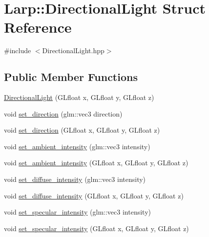 \hypertarget{structLarp_1_1DirectionalLight}{}\section{Larp\+:\+:Directional\+Light Struct Reference}
\label{structLarp_1_1DirectionalLight}


{\ttfamily \#include $<$Directional\+Light.\+hpp$>$}

\subsection*{Public Member Functions}
\begin{DoxyCompactItemize}
\item 
\hyperlink{structLarp_1_1DirectionalLight_ad2728490d1aa498b0574eb63613f235b}{Directional\+Light} (G\+Lfloat x, G\+Lfloat y, G\+Lfloat z)
\item 
void \hyperlink{structLarp_1_1DirectionalLight_a878ababc6a39e4b2b67602d64205c53f}{set\+\_\+direction} (glm\+::vec3 direction)
\item 
void \hyperlink{structLarp_1_1DirectionalLight_aad4b82372a316e60601a8f870630e419}{set\+\_\+direction} (G\+Lfloat x, G\+Lfloat y, G\+Lfloat z)
\item 
void \hyperlink{structLarp_1_1DirectionalLight_ad08a131b0b33003e8acd796d32fbfd76}{set\+\_\+ambient\+\_\+intensity} (glm\+::vec3 intensity)
\item 
void \hyperlink{structLarp_1_1DirectionalLight_a09bc2ff4f6e77010850b111faef4de9c}{set\+\_\+ambient\+\_\+intensity} (G\+Lfloat x, G\+Lfloat y, G\+Lfloat z)
\item 
void \hyperlink{structLarp_1_1DirectionalLight_a495daf788ab4a20c31f3c9192954d605}{set\+\_\+diffuse\+\_\+intensity} (glm\+::vec3 intensity)
\item 
void \hyperlink{structLarp_1_1DirectionalLight_a34ace53442ba5281d1f5fbd1825870fd}{set\+\_\+diffuse\+\_\+intensity} (G\+Lfloat x, G\+Lfloat y, G\+Lfloat z)
\item 
void \hyperlink{structLarp_1_1DirectionalLight_a3cacd659f1ffd6aac0ffa48e698befa9}{set\+\_\+specular\+\_\+intensity} (glm\+::vec3 intensity)
\item 
void \hyperlink{structLarp_1_1DirectionalLight_adecb3fe2ac82211a58d2454195ab2147}{set\+\_\+specular\+\_\+intensity} (G\+Lfloat x, G\+Lfloat y, G\+Lfloat z)
\end{DoxyCompactItemize}
